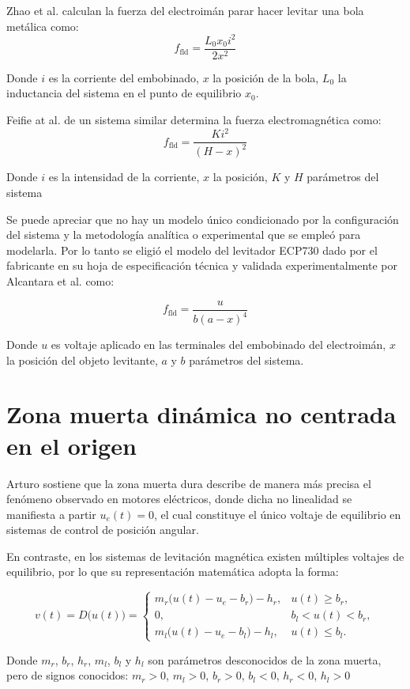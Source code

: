 Zhao et al. \cite{zhao} calculan la fuerza del electroimán parar hacer levitar una bola metálica como:
\[ f_{\text{fld}} = \frac{L_0 x_0 i^2}{2x^2} \]

Donde $i$ es la corriente del embobinado, $x$ la posición de la bola, $L_0$ la inductancia del sistema en el punto de equilibrio $x_0$.

Feifie at al. \cite{feifei} de un sistema similar determina la fuerza electromagnética como:
\[ f_{\text{fld}} = \frac{K i^2}{(H - x)^2} \]

Donde $i$ es la intensidad de la corriente, $x$ la posición, $K$ y $H$ parámetros del sistema



Se puede apreciar que no hay un modelo único condicionado por la configuración del sistema y la metodología analítica o experimental que se empleó para modelarla. Por lo tanto se eligió 
el modelo del levitador ECP730 dado por el fabricante en su hoja de especificación técnica \cite{parks} y validada experimentalmente por Alcantara et al. \cite{alcantara} como:

\[ f_{\text{fld}} = \frac{u}{b(a-x)^4} \]

Donde $u$ es voltaje aplicado en las terminales del embobinado del electroimán, $x$ la posición del objeto levitante, $a$ y $b$ parámetros del sistema.

\section{Zona muerta dinámica no centrada en el origen}
Arturo \cite{arturo_tesis} sostiene que la zona muerta dura describe de manera más precisa el fenómeno observado en motores eléctricos, 
donde dicha no linealidad se manifiesta a partir $u_e{(t)} = 0$, el cual constituye el único voltaje de equilibrio en sistemas de control de posición angular.

En contraste, en los sistemas de levitación magnética existen múltiples voltajes de equilibrio, por lo que su representación matemática adopta la forma:

\[
v(t) = D\big(u(t)\big) =
\begin{cases}
m_r \big(u(t) - u_e - b_r\big) - h_r, & u(t) \ge b_r, \\[6pt]
0, & b_l < u(t) < b_r, \\[6pt]
m_l \big(u(t) - u_e - b_l\big) - h_l, & u(t) \le b_l.
\end{cases}
\]

Donde $m_r$, $b_r$, $h_r$, $m_l$, $b_l$ y $h_l$ son parámetros desconocidos de la zona muerta, pero de signos conocidos:
$m_r > 0$, $m_l > 0$, $b_r > 0$, $b_l < 0$, $h_r < 0$, $h_l > 0$

